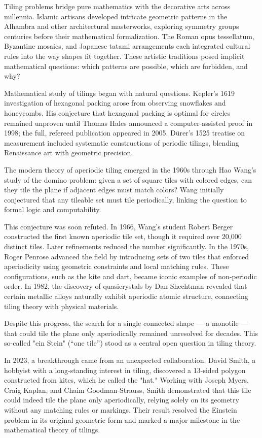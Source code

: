 \begin{historical}
Tiling problems bridge pure mathematics with the decorative arts across millennia. Islamic artisans developed intricate geometric patterns in the Alhambra and other architectural masterworks, exploring symmetry groups centuries before their mathematical formalization. The Roman opus tessellatum, Byzantine mosaics, and Japanese tatami arrangements each integrated cultural rules into the way shapes fit together. These artistic traditions posed implicit mathematical questions: which patterns are possible, which are forbidden, and why?

Mathematical study of tilings began with natural questions. Kepler's 1619 investigation of hexagonal packing arose from observing snowflakes and honeycombs. His conjecture that hexagonal packing is optimal for circles remained unproven until Thomas Hales announced a computer-assisted proof in 1998; the full, refereed publication appeared in 2005. Dürer's 1525 treatise on measurement included systematic constructions of periodic tilings, blending Renaissance art with geometric precision.

The modern theory of aperiodic tiling emerged in the 1960s through Hao Wang's study of the domino problem: given a set of square tiles with colored edges, can they tile the plane if adjacent edges must match colors? Wang initially conjectured that any tileable set must tile periodically, linking the question to formal logic and computability.

This conjecture was soon refuted. In 1966, Wang’s student Robert Berger constructed the first known aperiodic tile set, though it required over 20,000 distinct tiles. Later refinements reduced the number significantly. In the 1970s, Roger Penrose advanced the field by introducing sets of two tiles that enforced aperiodicity using geometric constraints and local matching rules. These configurations, such as the kite and dart, became iconic examples of non-periodic order. In 1982, the discovery of quasicrystals by Dan Shechtman revealed that certain metallic alloys naturally exhibit aperiodic atomic structure, connecting tiling theory with physical materials.

Despite this progress, the search for a single connected shape — a monotile — that could tile the plane only aperiodically remained unresolved for decades. This so-called "ein Stein"  (“one tile”) stood as a central open question in tiling theory.

In 2023, a breakthrough came from an unexpected collaboration. David Smith, a hobbyist with a long-standing interest in tiling, discovered a 13-sided polygon constructed from kites, which he called the "hat." Working with Joseph Myers, Craig Kaplan, and Chaim Goodman-Strauss, Smith demonstrated that this tile could indeed tile the plane only aperiodically, relying solely on its geometry without any matching rules or markings. Their result resolved the Einstein problem in its original geometric form and marked a major milestone in the mathematical theory of tilings.
\end{historical}
